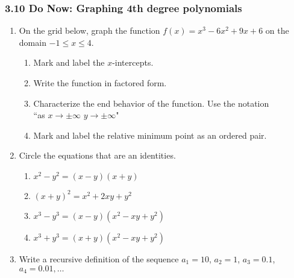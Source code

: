 \documentclass[12pt, twoside]{article}
\begin{document}
\subsubsection*{3.10 Do Now: Graphing 4th degree polynomials}
\begin{enumerate}
\item On the grid below, graph the function $f(x) = x^{3} - 6x^{2} + 9x + 6$ on the domain $-1\leq x \leq 4$. 
  \begin{enumerate}
      \item Mark and label the $x$-intercepts. 
      \item Write the function in factored form. \vspace{1.5cm}
      \item Characterize the end behavior of the function. Use the notation \\
      ``as $x \rightarrow \pm \infty$ $y \rightarrow\pm \infty$"    
      \item Mark and label the relative minimum point as an ordered pair.
  \end{enumerate} \hspace{2cm}
  
    \begin{center}
    \end{center}

\newpage
\item Circle the equations that are an identities.
    \begin{multicols}{2}
      \begin{enumerate}
        \item \(x^2 - y^2 = (x - y)(x+y)\)
        \item \((x + y)^2 = x^2 + 2xy + y^2\)
        \item \(x^3 - y^3 = (x - y)(x^2 - xy + y^2)\)
        \item \(x^3 + y^3 = (x + y)(x^2 - xy + y^2)\)
      \end{enumerate}
    \end{multicols}

\item Write a recursive definition of the sequence $a_1 = 10$, $a_2 = 1$, $a_3 = 0.1$, $a_4 = 0.01, \ldots$ \vspace{2cm}
    

\end{enumerate}
\end{document}
